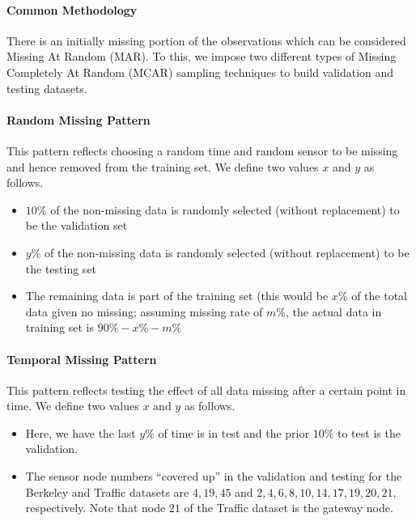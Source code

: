 \paragraph*{Common Methodology}

There is an initially missing portion of the observations which can be considered Missing At Random (MAR).
To this, we impose two different types of Missing Completely At Random (MCAR) sampling techniques to build validation and testing datasets.

\paragraph*{Random Missing Pattern}

This pattern reflects choosing a random time and random sensor to be missing and hence removed from the training set.
We define two values $x$ and $y$ as follows.

\begin{itemize}
\item $10\%$ of the non-missing data is randomly selected (without replacement) to be the validation set
\item $y\%$ of the non-missing data is randomly selected (without replacement) to be the testing set
\item The remaining data is part of the training set (this would be $x\%$ of the total data given no missing; assuming missing rate of $m\%$, the actual data in training set is $90\%-x\%-m\%$
\end{itemize}

\paragraph*{Temporal Missing Pattern}

This pattern reflects testing the effect of all data missing after a certain point in time.
We define two values $x$ and $y$ as follows.

\begin{itemize}
\item Here, we have the last $y\%$ of time is in test and the prior $10\%$ to test is the validation.
\item The sensor node numbers ``covered up'' in the validation and testing for the Berkeley and Traffic datasets are ${4,19,45}$ and ${2,4,6,8,10,14,17,19,20,21}$, respectively.
Note that node $21$ of the Traffic dataset is the gateway node.
\end{itemize}
